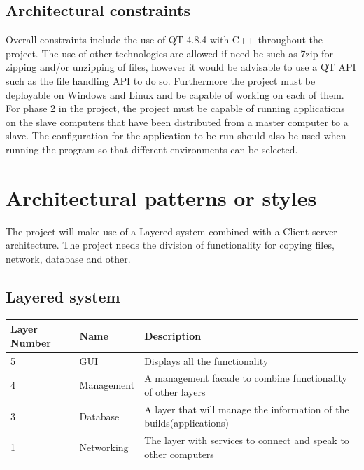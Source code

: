 \documentclass[a4paper,12pt,final]{article}
\begin{document}
\subsection{Architectural constraints}
Overall constraints include the use of QT 4.8.4 with C++ throughout the project. The use of other technologies are allowed if need be such as 7zip for zipping and/or unzipping of files, however it would be advisable to use a QT API such as the file handling API to do so. Furthermore the project must be deployable on Windows and Linux and be capable of working on each of them.
\vspace{6pt}\newline
For phase 2 in the project, the project must be capable of running applications on the slave computers that have been distributed from a master computer to a slave. The configuration for the application to be run should also be used when running the program so that different environments can be selected.

\section{Architectural patterns or styles}
The project will make use of a Layered system combined with a Client server architecture. The project  needs the division of functionality for copying files, network, database and other.
\vspace{6pt}\newline
\subsection{Layered system}
\begin{tabular}{|l|l|p{8cm}|}   
\hline
Layer Number & Name & Description\\
\hline
5 & GUI & Displays all the functionality\\
\hline
4 & Management & A management facade to combine functionality of other layers\\
\hline
3 & Database & A layer that will manage the information of the builds(applications)\\
\hline
1 & Networking & The layer with services to connect and speak to other computers\\
\hline
\end{tabular}

\end{document}
